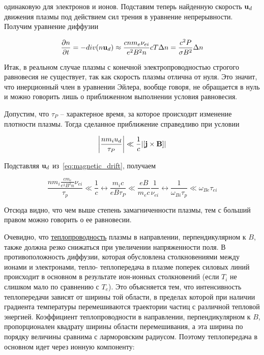 \documentclass[10pt, a4paper]{article}
\begin{document}
одинаковую для электронов и ионов. Подставим теперь найденную скорость $\vb{u}_d $ движения плазмы под действием сил трения в уравнение непрерывности. Получим уравнение
диффузии

\begin{equation*}
	\pdv{n}{t} = -div(n\vb{u}_d) \approx \frac{cnm_e\nu_{ei}}{e^2 B^2n}cT\Delta n = \frac{c^2P}{\sigma B^2} \Delta n
\end{equation*}

Итак, в реальном случае плазмы с конечной электропроводностью строгого равновесия не существует, так как скорость плазмы отлична от нуля. Это значит, что инерционный член в уравнении Эйлера, вообще говоря, не обращается в нуль и можно говорить лишь о приближенном выполнении условия равновесия.

Допустим, что $\tau_P$ -- характерное время, за которое происходит
изменение плотности плазмы. Тогда сделанное приближение справедливо при условии

\begin{equation*}
	\abs{\frac{nm_iu_d}{\tau_P}} \ll \frac{1}{c} \abs{[\vb{j}\times\vb{B}]}
\end{equation*}

Подставляя $\vb{u}_d$ из~\eqref{eq:magnetic_drift}, получаем

\begin{equation*}
	\frac{nm_i\frac{cm_e}{e^2B^2n}\nu_{ei}}{\tau_p}\ll\frac{1}{c}\leftrightarrow \frac{m_i c}{e B\tau_P} \ll \frac{eB}{m_ec}\frac{1}{\nu_{ei}} \leftrightarrow \frac{1}{\omega_{Bi}\tau_p}\ll\omega_{Be}\tau_{ei}
\end{equation*}

Отсюда видно, что чем выше степень замагниченности плазмы, тем
с больший правом можно говорить о ее равновесии.

Очевидно, что \uline{теплопроводность} плазмы в направлении, перпендикулярном к $B$, также должна резко снижаться при увеличении напряженности поля. В противоположность диффузии, которая обусловлена столкновениями между ионами и электронами, тепло- теплопередача в плазме поперек силовых линий происходит в основном в результате ион-ионных столкновений (если $T_i$ не слишком мало по сравнению с $T_e$). Это объясняется тем, что интенсивность теплопередачи зависят от ширины той области, в пределах которой при наличии градиента температуры перемешиваются траектории частиц с различной тепловой энергией. Коэффициент теплопроводности в направлении, перпендикулярном к $B$, пропорционален квадрату ширины области перемешивания, а эта ширина по порядку величины сравнима с ларморовским радиусом. Поэтому теплопередача в основном идет через ионную компоненту:
\end{document}
